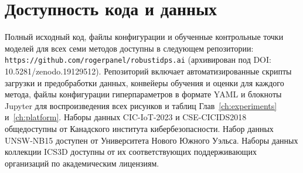 \section{Доступность кода и данных}
\label{app:availability}

Полный исходный код, файлы конфигурации и обученные контрольные точки моделей для всех семи методов доступны в следующем репозитории: \texttt{https://github.com/rogerpanel/robustidps.ai} (архивирован под DOI: 10.5281/zenodo.19129512). Репозиторий включает автоматизированные скрипты загрузки и предобработки данных, конвейеры обучения и оценки для каждого метода, файлы конфигурации гиперпараметров в формате YAML и блокноты Jupyter для воспроизведения всех рисунков и таблиц Глав~\ref{ch:experiments} и~\ref{ch:platform}. Наборы данных CIC-IoT-2023 и CSE-CICIDS2018 общедоступны от Канадского института кибербезопасности. Набор данных UNSW-NB15 доступен от Университета Нового Южного Уэльса. Наборы данных коллекции ICS3D доступны от их соответствующих поддерживающих организаций по академическим лицензиям.
